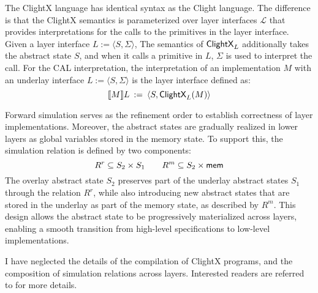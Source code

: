 The ClightX language has identical syntax
as the Clight language.
The difference is that
the ClightX semantics
is parameterized over layer interfaces $\mathcal{L}$
that provides interpretations for
the calls to the primitives in the layer interface.
Given a layer interface $L := \langle S, \Sigma \rangle$,
The semantics of $ \mathsf{ClightX} _L$
additionally takes the abstract state $S$,
and when it calls a primitive in $L$,
$\Sigma$ is used to interpret the call.
For the CAL interpretation,
the interpretation of an implementation $M$
with an underlay interface $L := \langle S, \Sigma \rangle$
is the layer interface defined as:
\[
  \llbracket M \rrbracket L \::=\: \langle S,  \mathsf{ClightX} _L(M) \rangle
\]

Forward simulation serves
as the refinement order to establish correctness
of layer implementations.
Moreover,
the abstract states
are gradually realized in lower layers
as global variables stored in the memory state.
To support this,
the simulation relation is defined
by two components:
\[
  R^r \subseteq S_2 \times S_1 \qquad
  R^m \subseteq S_2 \times  \mathsf{mem} 
\]
The overlay abstract state $S_2$
preserves part of the underlay abstract states $S_1$
through the relation $R^r$,
while also introducing new abstract states
that are stored in the underlay as part of the memory state,
as described by $R^m$.
This design
allows the abstract state to be
progressively materialized across layers,
enabling a smooth transition
from high-level specifications
to low-level implementations.

I have neglected the details of
the compilation of ClightX programs,
and the composition of simulation relations
across layers.
Interested readers are referred to \citep{popl15}
for more details.





